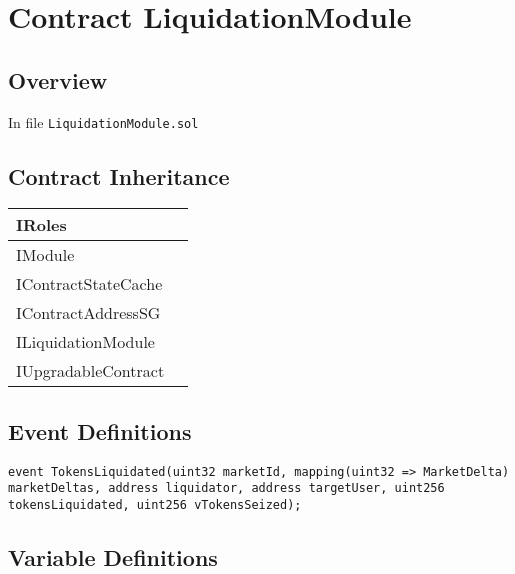 
\chapter{Contract LiquidationModule}

\minitoc

\section{Overview}


In file {\tt LiquidationModule.sol}

\section{Contract Inheritance}


\noindent\begin{tabular}{|l|p{5cm}|}\hline
IRoles & \\\hline
IModule & \\\hline
IContractStateCache & \\\hline
IContractAddressSG & \\\hline
ILiquidationModule & \\\hline
IUpgradableContract & \\\hline
\end{tabular}


\section{Event Definitions}


\begin{lstlisting}[firstnumber=16]
    event TokensLiquidated(uint32 marketId, mapping(uint32 => MarketDelta) marketDeltas, address liquidator, address targetUser, uint256 tokensLiquidated, uint256 vTokensSeized);
\end{lstlisting}

\section{Variable Definitions}



